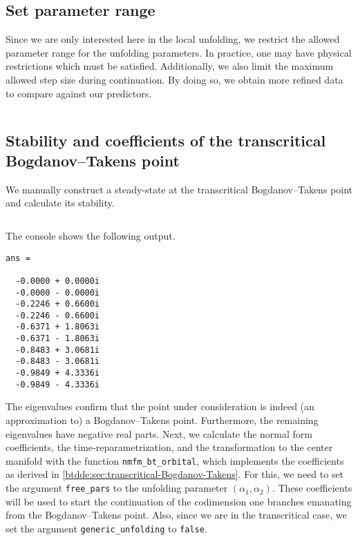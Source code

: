 \subsection{Set parameter range}
Since we are only interested here in the local unfolding, we restrict the
allowed parameter range for the unfolding parameters. In practice, one may have
physical restrictions which must be satisfied. Additionally, we also limit the
maximum allowed step size during continuation. By doing so, we obtain more refined
data to compare against our predictors.
\inputminted[firstline=35, lastline=38]{MATLAB}{\pathToDDEBifToolDemos/BAM_neural_network_model/BAMnn.m}

\subsection{Stability and coefficients of the transcritical Bogdanov--Takens point}
We manually construct a steady-state at the transcritical Bogdanov--Takens
point and calculate its stability.
\inputminted[firstline=40, lastline=49]{MATLAB}{\pathToDDEBifToolDemos/BAM_neural_network_model/BAMnn.m}

The \MATLAB console shows the following output.
\begin{verbatim}
ans =

  -0.0000 + 0.0000i
  -0.0000 - 0.0000i
  -0.2246 + 0.6600i
  -0.2246 - 0.6600i
  -0.6371 + 1.8063i
  -0.6371 - 1.8063i
  -0.8483 + 3.0681i
  -0.8483 - 3.0681i
  -0.9849 + 4.3336i
  -0.9849 - 4.3336i
\end{verbatim}
The eigenvalues confirm that the point under consideration is indeed (an
approximation to) a Bogdanov--Takens point. Furthermore, the remaining eigenvalues have
negative real parts. Next, we calculate the normal form coefficients, the
time-reparametrization, and the transformation to the center manifold with the
function \texttt{nmfm_bt_orbital}, which implements the coefficients as derived in
\cref{btdde:sec:transcritical-Bogdanov-Takens}. For this, we need to set the argument
\texttt{free_pars} to the unfolding parameter $(\alpha_1,\alpha_2)$. These
coefficients will be used to start the continuation of the codimension one branches
emanating from the Bogdanov--Takens point. Also, since we are in the transcritical case,
we set the argument \texttt{generic_unfolding} to \texttt{false}.
\inputminted[firstline=51, lastline=55]{MATLAB}{\pathToDDEBifToolDemos/BAM_neural_network_model/BAMnn.m}

